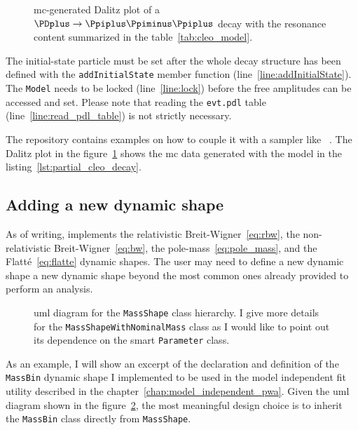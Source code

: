         
        \begin{figure}
            \centering
            
            \caption{\ac{mc}-generated Dalitz plot of a $\PDplus \to \Ppiplus\Ppiminus\Ppiplus$ decay with the resonance content summarized in the table~\ref{tab:cleo_model}.}
            \label{fig:partial_cleo_decay}
        \end{figure}
        The initial-state particle must be set after the whole decay structure has been defined with the \lstinline!addInitialState! member function (line~\ref{line:addInitialState}).
        The \lstinline!Model! needs to be locked (line~\ref{line:lock}) before the free amplitudes can be accessed and set.
        Please note that reading the \texttt{evt.pdl} table (line~\ref{line:read_pdl_table}) is not strictly necessary.


        The  repository contains examples on how to couple it with a sampler like ~\cite{Caldwell20092197}.
        The Dalitz plot in the figure~\ref{fig:partial_cleo_decay} shows the \ac{mc} data generated with the model in the listing~\ref{lst:partial_cleo_decay}.


        \subsection{Adding a new dynamic shape}

        As of writing,  implements the relativistic Breit-Wigner~\eqref{eq:rbw}, the non-relativistic Breit-Wigner~\eqref{eq:bw}, the pole-mass~\eqref{eq:pole_mass}, and the Flatté~\eqref{eq:flatte} dynamic shapes.
        The user may need to define a new dynamic shape a new dynamic shape beyond the most common ones already provided to perform an analysis.


    \begin{figure}
        \centering
        
        \caption{\Ac{uml} diagram for the \lstinline!MassShape! class hierarchy. I give more details for the \lstinline!MassShapeWithNominalMass! class as I would like to point out its dependence on the smart \lstinline!Parameter! class.}
        \label{fig:mass_shape_hierarchy}
    \end{figure}
    As an example, I will show an excerpt of the declaration and definition of the \lstinline!MassBin! dynamic shape I implemented to be used in the model independent fit utility described in the chapter~\ref{chap:model_independent_pwa}.
    Given the \ac{uml} diagram shown in the figure~\ref{fig:mass_shape_hierarchy}, the most meaningful design choice is to inherit the \lstinline!MassBin! class directly from \lstinline!MassShape!.
    

